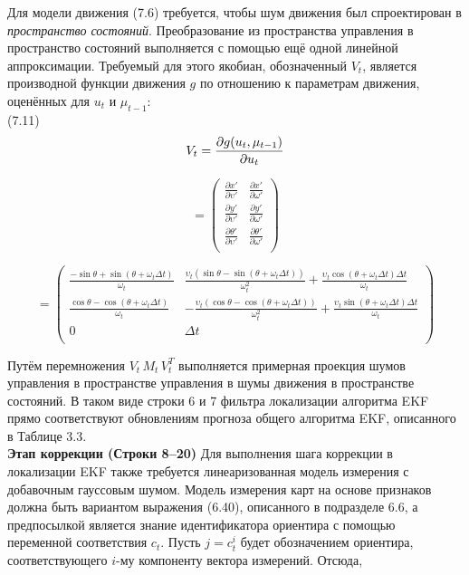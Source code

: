 \documentclass[10pt,a4paper]{article}
\begin{document}
Для модели движения (7.6) требуется, чтобы шум движения был спроектирован в \textit{пространство состояний}. Преобразование из пространства управления в пространство состояний выполняется с помощью ещё одной линейной аппроксимации. Требуемый для этого якобиан, обозначенный $V_t$, является производной функции движения $g$ по отношению к параметрам движения, оценённых для $u_t$ и $\mu_{t-1}$:\\

(7.11)
\begin{equation*}
V_t=\frac{\partial g(u_t,\mu_{t-1})}{\partial u_t}\\
\end{equation*}

\begin{equation*}
=\left(\begin{array}{cc}
\frac{\partial x'}{\partial\upsilon'}&\frac{\partial x'}{\partial\omega'}\\
\frac{\partial y'}{\partial\upsilon'}&\frac{\partial y'}{\partial\omega'}\\
\frac{\partial \theta'}{\partial\upsilon'}&\frac{\partial \theta'}{\partial\omega'}\\
\end{array}\right)
\end{equation*}

\begin{equation*}
=\left(\begin{array}{cc}
\frac{-\sin\theta+\sin(\theta+\omega_t\varDelta t)}{\omega_t}&\frac{\upsilon_t(\sin\theta-\sin(\theta+\omega_t\varDelta t))}{\omega_t^2}+\frac{\upsilon_t\cos(\theta+\omega_t\varDelta t)\varDelta t}{\omega_t}\\
\frac{\cos\theta-\cos(\theta+\omega_t\varDelta t)}{\omega_t}&-\frac{\upsilon_t(\cos\theta-\cos(\theta+\omega_t\varDelta t))}{\omega_t^2}+\frac{\upsilon_t\sin(\theta+\omega_t\varDelta t)\varDelta t}{\omega_t}\\
0&\varDelta t\\
\end{array}\right)
\end{equation*}

Путём перемножения $V_t\, M_t\, V_t^T$ выполняется примерная проекция шумов управления в пространстве управления в шумы движения в пространстве состояний.
В таком виде строки 6 и 7 фильтра локализации алгоритма EKF прямо соответствуют обновлениям прогноза общего алгоритма EKF, описанного в Таблице 3.3.\\

\textbf{Этап коррекции (Строки 8–20)} Для выполнения шага коррекции в локализации EKF также требуется линеаризованная модель измерения с добавочным гауссовым шумом. Модель измерения карт на основе признаков должна быть вариантом выражения (6.40), описанного в подразделе 6.6, а предпосылкой является знание идентификатора ориентира с помощью переменной соответствия $c_t$. Пусть $j = c^i_t$ будет обозначением ориентира, соответствующего $i$-му компоненту вектора измерений. Отсюда,\\
\end{document}
